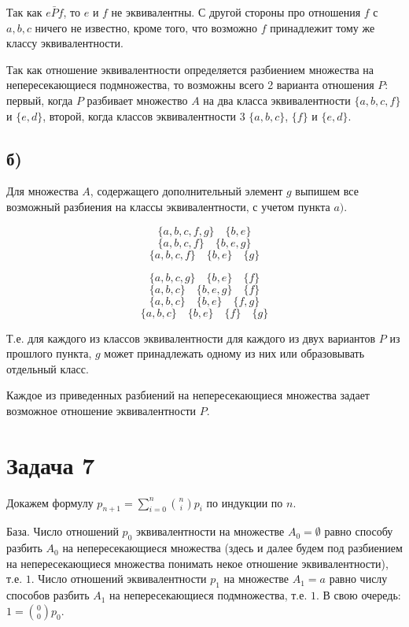 \documentclass{article}
\begin{document}
	Так как $e \bar{P} f$, то $e$ и $f$ не эквивалентны. С другой стороны про отношения $f$ с $a, b, c$ ничего не известно, кроме того, что возможно $f$ принадлежит тому же классу эквивалентности.
	
	Так как отношение эквивалентности определяется разбиением множества на непересекающиеся подмножества, то возможны всего 2 варианта отношения $P$: первый, когда $P$ разбивает множество $A$ на два класса эквивалентности $\{a, b, c, f\}$ и $\{e, d\}$, второй, когда классов эквивалентности 3 $\{a, b, c\}$, $\{f\}$ и $\{e, d\}$.
	
	\subsection {б)}
	
	Для множества $A$, содержащего дополнительный элемент $g$ выпишем все возможный разбиения на классы эквивалентности, с учетом пункта $a)$.
	
	$$\{a, b, c, f, g\} \quad \{b, e\}$$
	$$\{a, b, c, f\} \quad \{b, e, g\}$$
	$$\{a, b, c, f\} \quad \{b, e\} \quad \{g\}$$
	
	$$\{a, b, c, g\} \quad \{b, e\} \quad \{f\}$$
	$$\{a, b, c\} \quad \{b, e, g\} \quad \{f\}$$
	$$\{a, b, c\} \quad \{b, e\} \quad \{f, g\}$$
	$$\{a, b, c\} \quad \{b, e\} \quad \{f\} \quad \{g\}$$
	
	Т.е. для каждого из классов эквивалентности для каждого из двух вариантов $P$ из прошлого пункта, $g$ может принадлежать одному из них или образовывать отдельный класс.
	
	Каждое из приведенных разбиений на непересекающиеся множества задает возможное отношение эквивалентности $P$.
	
	\section{Задача 7}
	
	Докажем формулу $p_{n+1} = \sum_{i=0}^{n} {n \choose i} p_i$ по индукции по $n$.
	
	База. Число отношений $p_0$ эквивалентности на множестве $A_0 = \emptyset$ равно способу разбить $A_0$ на непересекающиеся множества (здесь и далее будем под разбиением на непересекающиеся множества понимать некое отношение эквивалентности), т.е. $1$. Число отношений эквивалентности $p_1$ на множестве $A_1 = {a}$ равно числу способов разбить $A_1$ на непересекающиеся подмножества, т.е. $1$. В свою очередь: $1 = {0 \choose 0} p_0$.
	
\end{document}
